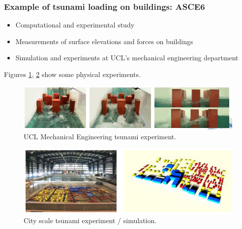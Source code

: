 \subsubsection{Example of tsunami loading on buildings: ASCE6}
\begin{itemize}
    \item Computational and experimental study
    \item Measurements of surface elevations and forces on buildings
    \item Simulation and experiments at UCL's mechanical engineering department
\end{itemize}
Figures \ref{tsunami1}, \ref{tsunami2} show some physical experiments.
\begin{figure}[htbp]
    \centering
    \includegraphics[width = 0.8 \textwidth]{./img/figure84.png}
    \caption{UCL Mechanical Engineering tsunami experiment.}
    \label{tsunami1}
\end{figure}
\begin{figure}[htbp]
    \centering
    \includegraphics[width = 0.8 \textwidth]{./img/figure85.png}
    \caption{City scale tsunami experiment / simulation.}
    \label{tsunami2}
\end{figure}